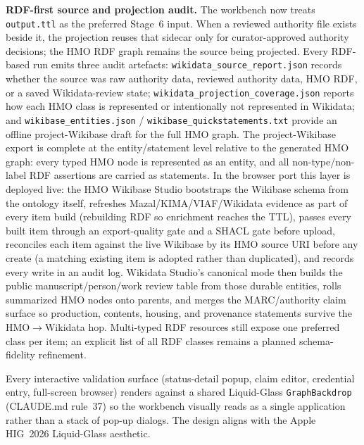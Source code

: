 \documentclass[Afour,sageh,times]{sagej}
\newcommand{\code}[1]{\texttt{#1}}
\begin{document}
\textbf{RDF-first source and projection audit.} The workbench now treats \texttt{output.ttl} as the preferred Stage~6 input. When a reviewed authority file exists beside it, the projection reuses that sidecar only for curator-approved authority decisions; the HMO RDF graph remains the source being projected. Every RDF-based run emits three audit artefacts: \texttt{wikidata\_source\_report.json} records whether the source was raw authority data, reviewed authority data, HMO RDF, or a saved Wikidata-review state; \texttt{wikidata\_projection\_coverage.json} reports how each HMO class is represented or intentionally not represented in Wikidata; and \texttt{wikibase\_entities.json} / \texttt{wikibase\_quickstatements.txt} provide an offline project-Wikibase draft for the full HMO graph. The project-Wikibase export is complete at the entity/statement level relative to the generated HMO graph: every typed HMO node is represented as an entity, and all non-type/non-label RDF assertions are carried as statements. In the browser port this layer is deployed live: the HMO Wikibase Studio bootstraps the Wikibase schema from the ontology itself, refreshes Mazal/KIMA/VIAF/Wikidata evidence as part of every item build (rebuilding RDF so enrichment reaches the TTL), passes every built item through an export-quality gate and a SHACL gate before upload, reconciles each item against the live Wikibase by its HMO source URI before any create (a matching existing item is adopted rather than duplicated), and records every write in an audit log. Wikidata Studio's canonical mode then builds the public manuscript/person/work review table from those durable entities, rolls summarized HMO nodes onto parents, and merges the MARC/authority claim surface so production, contents, housing, and provenance statements survive the HMO$\to$Wikidata hop. Multi-typed RDF resources still expose one preferred class per item; an explicit list of all RDF classes remains a planned schema-fidelity refinement.

Every interactive validation surface (status-detail popup, claim editor, credential entry, full-screen browser) renders against a shared Liquid-Glass \code{GraphBackdrop} (CLAUDE.md rule~37) so the workbench visually reads as a single application rather than a stack of pop-up dialogs. The design aligns with the Apple HIG~2026 Liquid-Glass aesthetic.
\end{document}
